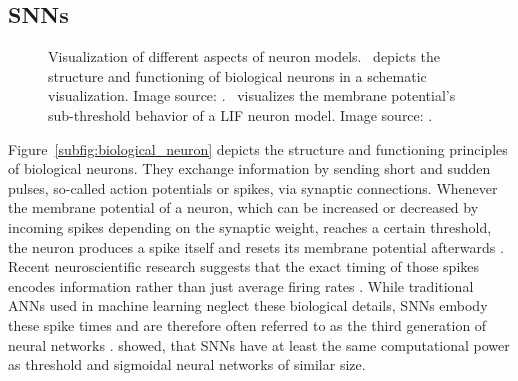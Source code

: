\subsection{\aclp{SNN}}
\label{subsec:SNN}
\begin{figure}[t!]
	\centering
    \caption{Visualization of different aspects of neuron models.~\protect{} depicts the structure and functioning of biological neurons in a schematic visualization. Image source: \textcite{Gerstner2002}.~\protect{} visualizes the membrane potential's sub-threshold behavior of a \ac{LIF} neuron model. Image source: \textcite{Masquelier2007}.}
    \label{fig:neuron_models}
\end{figure}

Figure~\ref{subfig:biological_neuron} depicts the structure and functioning principles of biological neurons.
They exchange information by sending short and sudden pulses, so-called action potentials or spikes, via synaptic connections.
Whenever the membrane potential of a neuron, which can be increased or decreased by incoming spikes depending on the synaptic weight, reaches a certain threshold, the neuron produces a spike itself and resets its membrane potential afterwards \parencite{Gerstner2002, Paugam2009}.
Recent neuroscientific research suggests that the exact timing of those spikes encodes information rather than just average firing rates \parencite{Bohte2004}.
While traditional \acp{ANN} used in machine learning neglect these biological details, \acp{SNN} embody these spike times and are therefore often referred to as the third generation of neural networks \parencite{Maass1997, Paugam2009}.
\textcite{Maass1997} showed, that \acp{SNN} have at least the same computational power as threshold and sigmoidal neural networks of similar size.

